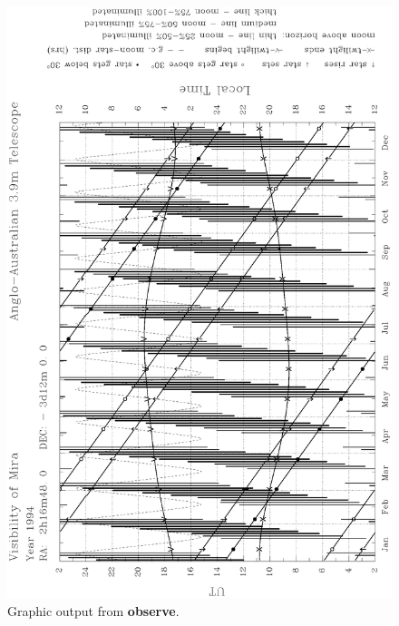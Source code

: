 \documentclass[11pt]{article}
\newcommand{\xlabel}[1]{}
\begin{document}
\newpage

\begin{figure}
\begin{center}
\includegraphics{sun146_fig.eps}
\vspace{5mm}
\caption{Graphic output from {\bf{observe}}.}
\label{fig_output}
\xlabel{fig_output}
\end{center}
\end{figure}
\end{document}
